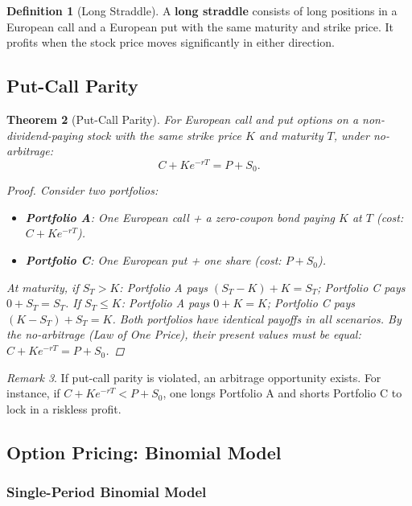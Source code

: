 \documentclass[12pt, a4paper]{article}
\theoremstyle{plain}
\newtheorem{theorem}{Theorem}[section]
\theoremstyle{definition}
\newtheorem{definition}[theorem]{Definition}
\theoremstyle{remark}
\newtheorem{remark}[theorem]{Remark}
\begin{document}
\begin{definition}[Long Straddle]
  A \textbf{long straddle} consists of long positions in a European call and a European put with the same maturity and strike price. It profits when the stock price moves significantly in either direction.
\end{definition}

\subsection{Put-Call Parity}

\begin{theorem}[Put-Call Parity]
  For European call and put options on a non-dividend-paying stock with the same strike price $K$ and maturity $T$, under no-arbitrage:
  \[
    C + Ke^{-rT} = P + S_0.
  \]
  \begin{proof}
    Consider two portfolios:
    \begin{itemize}
      \item \textbf{Portfolio A}: One European call + a zero-coupon bond paying $K$ at $T$ (cost: $C + Ke^{-rT}$).
      \item \textbf{Portfolio C}: One European put + one share (cost: $P + S_0$).
    \end{itemize}
    At maturity, if $S_T > K$: Portfolio A pays $(S_T - K) + K = S_T$; Portfolio C pays $0 + S_T = S_T$. If $S_T \leq K$: Portfolio A pays $0 + K = K$; Portfolio C pays $(K - S_T) + S_T = K$. Both portfolios have identical payoffs in all scenarios. By the no-arbitrage (Law of One Price), their present values must be equal: $C + Ke^{-rT} = P + S_0$.
  \end{proof}
\end{theorem}

\begin{remark}
  If put-call parity is violated, an arbitrage opportunity exists. For instance, if $C + Ke^{-rT} < P + S_0$, one longs Portfolio A and shorts Portfolio C to lock in a riskless profit.
\end{remark}

\subsection{Option Pricing: Binomial Model}

\subsubsection{Single-Period Binomial Model}
\end{document}
